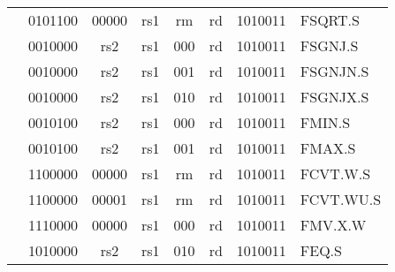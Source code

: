 \begin{table}[p]
\begin{small}
\begin{center}
\begin{tabular}{p{0in}p{0.4in}p{0.05in}p{0.05in}p{0.05in}p{0.05in}p{0.4in}p{0.6in}p{0.4in}p{0.6in}p{0.7in}l}
&
\multicolumn{4}{|c|}{0101100} &
\multicolumn{2}{c|}{00000} &
\multicolumn{1}{c|}{rs1} &
\multicolumn{1}{c|}{rm} &
\multicolumn{1}{c|}{rd} &
\multicolumn{1}{c|}{1010011} & FSQRT.S \\
\cline{2-11}


&
\multicolumn{4}{|c|}{0010000} &
\multicolumn{2}{c|}{rs2} &
\multicolumn{1}{c|}{rs1} &
\multicolumn{1}{c|}{000} &
\multicolumn{1}{c|}{rd} &
\multicolumn{1}{c|}{1010011} & FSGNJ.S \\
\cline{2-11}


&
\multicolumn{4}{|c|}{0010000} &
\multicolumn{2}{c|}{rs2} &
\multicolumn{1}{c|}{rs1} &
\multicolumn{1}{c|}{001} &
\multicolumn{1}{c|}{rd} &
\multicolumn{1}{c|}{1010011} & FSGNJN.S \\
\cline{2-11}


&
\multicolumn{4}{|c|}{0010000} &
\multicolumn{2}{c|}{rs2} &
\multicolumn{1}{c|}{rs1} &
\multicolumn{1}{c|}{010} &
\multicolumn{1}{c|}{rd} &
\multicolumn{1}{c|}{1010011} & FSGNJX.S \\
\cline{2-11}


&
\multicolumn{4}{|c|}{0010100} &
\multicolumn{2}{c|}{rs2} &
\multicolumn{1}{c|}{rs1} &
\multicolumn{1}{c|}{000} &
\multicolumn{1}{c|}{rd} &
\multicolumn{1}{c|}{1010011} & FMIN.S \\
\cline{2-11}


&
\multicolumn{4}{|c|}{0010100} &
\multicolumn{2}{c|}{rs2} &
\multicolumn{1}{c|}{rs1} &
\multicolumn{1}{c|}{001} &
\multicolumn{1}{c|}{rd} &
\multicolumn{1}{c|}{1010011} & FMAX.S \\
\cline{2-11}


&
\multicolumn{4}{|c|}{1100000} &
\multicolumn{2}{c|}{00000} &
\multicolumn{1}{c|}{rs1} &
\multicolumn{1}{c|}{rm} &
\multicolumn{1}{c|}{rd} &
\multicolumn{1}{c|}{1010011} & FCVT.W.S \\
\cline{2-11}


&
\multicolumn{4}{|c|}{1100000} &
\multicolumn{2}{c|}{00001} &
\multicolumn{1}{c|}{rs1} &
\multicolumn{1}{c|}{rm} &
\multicolumn{1}{c|}{rd} &
\multicolumn{1}{c|}{1010011} & FCVT.WU.S \\
\cline{2-11}


&
\multicolumn{4}{|c|}{1110000} &
\multicolumn{2}{c|}{00000} &
\multicolumn{1}{c|}{rs1} &
\multicolumn{1}{c|}{000} &
\multicolumn{1}{c|}{rd} &
\multicolumn{1}{c|}{1010011} & FMV.X.W \\
\cline{2-11}


&
\multicolumn{4}{|c|}{1010000} &
\multicolumn{2}{c|}{rs2} &
\multicolumn{1}{c|}{rs1} &
\multicolumn{1}{c|}{010} &
\multicolumn{1}{c|}{rd} &
\multicolumn{1}{c|}{1010011} & FEQ.S \\
\cline{2-11}



\end{tabular}
\end{center}
\end{small}
\end{table}
